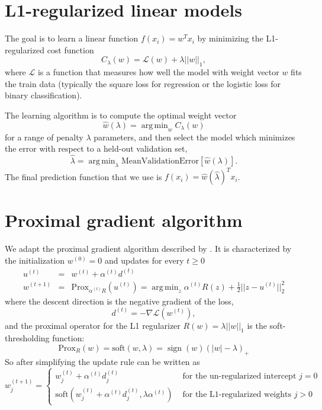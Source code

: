 \documentclass{article}
\DeclareMathOperator*{\sign}{sign}
\DeclareMathOperator*{\argmin}{arg\,min}
\begin{document}
\section{L1-regularized linear models}

The goal is to learn a linear function $f(x_i) = w^T x_i$ by
minimizing the L1-regularized cost function
\begin{equation}
  \label{eq:l1-reg-cost}
  C_\lambda(w) = \mathcal L(w) + \lambda ||w||_1,
\end{equation}
where $\mathcal L$ is a function that measures how well the model with
weight vector $w$ fits the train data (typically the square loss for
regression or the logistic loss for binary classification). 

The learning algorithm is to compute the optimal weight vector
\begin{equation}
  \label{eq:best_w_l1}
  \hat w(\lambda) = \argmin_w C_\lambda(w)
\end{equation}
for a range of penalty $\lambda$ parameters, and then select the model
which minimizes the error with respect to a held-out validation set,
\begin{equation}
  \label{eq:best_lambda}
  \hat \lambda = \argmin_\lambda \text{MeanValidationError}[ \hat w(\lambda) ].
\end{equation}
The final prediction function that we use is
$f(x_i) = \hat w(\hat \lambda)^T x_i$.

\section{Proximal gradient algorithm}

We adapt the proximal gradient algorithm described by
\citet[Section~13.4.3]{Murphy2012}. It is characterized by the
initialization $w^{(0)}=0$ and updates for every $t\geq 0$
\begin{eqnarray}
  \label{eq:prox-update}
  u^{(t)} &=& w^{(t)}+\alpha^{(t)} d^{(t)} \\
  w^{(t+1)} &=& \text{Prox}_{\alpha^{(t)} R}(u^{(t)}) = 
\argmin_z \alpha^{(t)} R(z) + \frac 1 2 ||z-u^{(t)}||^2_2
\end{eqnarray}
where the descent direction is the negative gradient of the loss,
\begin{equation}
  \label{eq:dt}
  d^{(t)} = -\nabla \mathcal L(w^{(t)}),
\end{equation}
and the proximal operator for the L1 regularizer $R(w)=\lambda||w||_1$
is the soft-thresholding function:
\begin{equation}
  \label{eq:proxl1}
  \text{Prox}_R(w) = \text{soft}(w,\lambda) = \sign(w)(|w|-\lambda)_+
\end{equation}
So after simplifying the update rule can be written as
\begin{equation}
w^{(t+1)}_j =
\begin{cases}
  w_j^{(t)}+\alpha^{(t)} d_j^{(t)} & \text{ for the un-regularized intercept $j=0$}\\
  \text{soft}(w_j^{(t)}+\alpha^{(t)} d_j^{(t)}, \lambda \alpha^{(t)}) & \text{ for the L1-regularized weights $j>0$}
\end{cases}
\end{equation}
\end{document}

